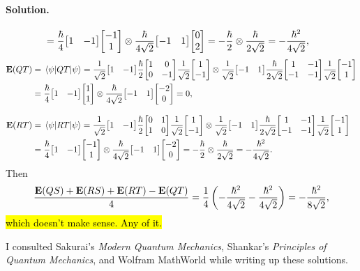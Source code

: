 \documentclass[11pt]{article}
\newcommand{\beq}{\begin{equation*}}
\newcommand{\eeq}{\end{equation*}}
\newenvironment{solution}
{
	\paragraph{Solution.}
}
{
	\bigskip
}
\begin{document}
\begin{solution}
\begin{align*}
		&= \frac{\hbar}{4} \mqty[ 1 & -1 ] \mqty[ -1 \\ 1 ] \otimes \frac{\hbar}{4 \sqrt{2}} \mqty[ -1 & 1 ] \mqty[ 0 \\ 2 ]
		= -\frac{\hbar}{2} \otimes \frac{\hbar}{2 \sqrt{2}}
		= -\frac{\hbar^2}{4 \sqrt{2}},
	\end{align*}
	\begin{align*}
		\vE(QT) &= \ev{Q T}{\psi}
		= \frac{1}{\sqrt{2}} \mqty[ 1 & -1 ] \frac{\hbar}{2} \mqty[ 1 & 0 \\ 0 & -1 ] \frac{1}{\sqrt{2}} \mqty[ 1 \\ -1 ] \otimes \frac{1}{\sqrt{2}} \mqty[ -1 & 1 ] \frac{\hbar}{2\sqrt{2}} \mqty[ 1 & -1 \\ -1 & -1 ] \frac{1}{\sqrt{2}} \mqty[ -1 \\ 1 ] \\
		&= \frac{\hbar}{4} \mqty[ 1 & -1 ] \mqty[ 1 \\ 1 ] \otimes \frac{\hbar}{4 \sqrt{2}} \mqty[ -1 & 1 ] \mqty[ -2 \\ 0 ]
		= 0, \\[2ex]
		\vE(RT) &= \ev{R T}{\psi}
		= \frac{1}{\sqrt{2}} \mqty[ 1 & -1 ] \frac{\hbar}{2} \mqty[ 0 & 1 \\ 1 & 0 ] \frac{1}{\sqrt{2}} \mqty[ 1 \\ -1 ] \otimes \frac{1}{\sqrt{2}} \mqty[ -1 & 1 ] \frac{\hbar}{2\sqrt{2}} \mqty[ 1 & -1 \\ -1 & -1 ] \frac{1}{\sqrt{2}} \mqty[ -1 \\ 1 ] \\
		&= \frac{\hbar}{4} \mqty[ 1 & -1 ] \mqty[ -1 \\ 1 ] \otimes \frac{\hbar}{4 \sqrt{2}} \mqty[ -1 & 1 ] \mqty[ -2 \\ 0 ]
		= -\frac{\hbar}{2} \otimes \frac{\hbar}{2 \sqrt{2}}
		= -\frac{\hbar^2}{4 \sqrt{2}}.
	\end{align*}
	Then
	\beq
		\frac{\vE(QS) + \vE(RS) + \vE(RT) - \vE(QT)}{4} = \frac{1}{4} \left( -\frac{\hbar^2}{4 \sqrt{2}} - \frac{\hbar^2}{4 \sqrt{2}} \right)
		= -\frac{\hbar^2}{8 \sqrt{2}},
	\eeq
	\hl{which doesn't make sense.  Any of it.}
\end{solution}




\vfill
I consulted Sakurai's \emph{Modern Quantum Mechanics}, Shankar's \emph{Principles of Quantum Mechanics}, and Wolfram MathWorld while writing up these solutions.
\end{document}

